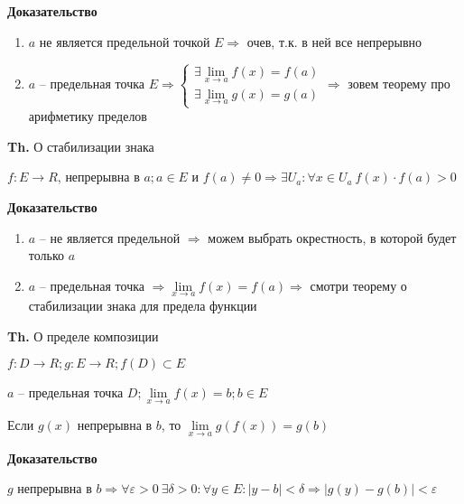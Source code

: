 \documentclass[14pt, letter paper]{article}
\begin{document}
\begin{center}
    \textbf{Доказательство}
\end{center}

\begin{enumerate}
    \item $a$ не является предельной точкой $E \Rightarrow$ очев, т.к. в ней все непрерывно
    \item $a$ -- предельная точка $E \Rightarrow \begin{cases}
        \exists \lim\limits_{x \rightarrow a}{f(x)} = f(a) \\
        \exists \lim\limits_{x \rightarrow a}{g(x)} = g(a)
    \end{cases} \Rightarrow$ зовем теорему про арифметику пределов
\end{enumerate}

\textbf{Th.} О стабилизации знака

$f : E \rightarrow R$, непрерывна в $a; a \in E$ и $f(a) \neq 0 \Rightarrow \exists U_a : \forall x \in U_a\ f(x) \cdot f(a) > 0$

\begin{center}
    \textbf{Доказательство}
\end{center}

\begin{enumerate}
    \item $a$ -- не является предельной $\Rightarrow$ можем выбрать окрестность, в которой будет только $a$

    \item $a$ -- предельная точка $\Rightarrow \lim\limits_{x \rightarrow a}{f(x)} = f(a) \Rightarrow$ смотри теорему о стабилизации знака для предела функции
\end{enumerate}

\textbf{Th.} О пределе композиции

$f : D \rightarrow R; g : E \rightarrow R; f(D) \subset E$

$a$ -- предельная точка $D; \lim\limits_{x \rightarrow a}{f(x)} = b; b \in E$

Если $g(x)$ непрерывна в $b$, то $\lim\limits_{x \rightarrow a}{g(f(x))} = g(b)$

\begin{center}
    \textbf{Доказательство}
\end{center}

$g$ непрерывна в $b \Rightarrow \forall \varepsilon > 0\ \exists \delta > 0 : \forall y \in E : |y - b| < \delta \Rightarrow |g(y) - g(b)| < \varepsilon$
\end{document}
